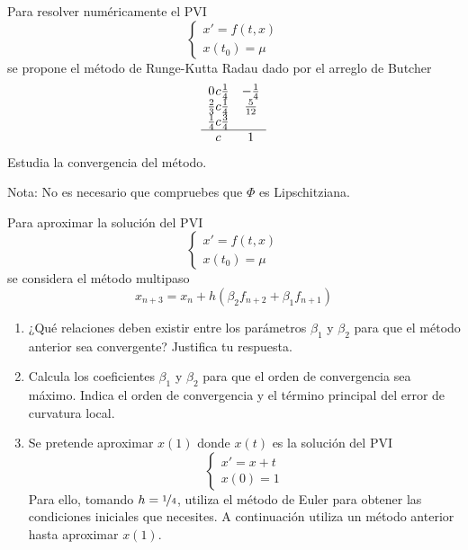 \begin{ejercicio}
    Para resolver numéricamente el PVI
    \begin{equation*}
        \begin{cases}
            x' = f(t, x) \\
            x(t_0) = \mu
        \end{cases}
    \end{equation*}
    se propone el método de Runge-Kutta Radau dado por el arreglo de Butcher
    \begin{equation*}
        \begin{array}{c@ccc}
            0 & \frac{1}{4} & -\frac{1}{4} \\
            \frac{2}{3} & \frac{1}{4} & \frac{5}{12} \\ 
            \frac{1}{4} & \frac{3}{4} \\ \hline
            & & 1
        \end{array}
    \end{equation*}
    Estudia la convergencia del método.
    
    Nota: No es necesario que compruebes que $\Phi$ es Lipschitziana.
\end{ejercicio}


\begin{ejercicio}
    Para aproximar la solución del PVI
    \begin{equation*}
        \begin{cases}
            x' = f(t, x) \\
            x(t_0) = \mu
        \end{cases}
    \end{equation*}
    se considera el método multipaso
    \begin{equation*}
        x_{n+3} = x_n + h(\beta_2 f_{n+2} + \beta_1 f_{n+1})
    \end{equation*}
    \begin{enumerate}
        \item ¿Qué relaciones deben existir entre los parámetros $\beta_1$ y $\beta_2$ para que el método anterior sea convergente? Justifica tu respuesta.
        \item Calcula los coeficientes $\beta_1$ y $\beta_2$ para que el orden de convergencia sea máximo. Indica el orden de convergencia y el término principal del error de curvatura local.
        \item Se pretende aproximar $x(1)$ donde $x(t)$ es la solución del PVI
            \begin{equation*}
                \begin{cases}
                    x' = x + t \\
                    x(0) = 1
                \end{cases}
            \end{equation*}
            Para ello, tomando $h = \nicefrac{1}{4}$, utiliza el método de Euler para obtener las condiciones iniciales que necesites. A continuación utiliza un método anterior hasta aproximar $x(1)$.
    \end{enumerate}
\end{ejercicio}